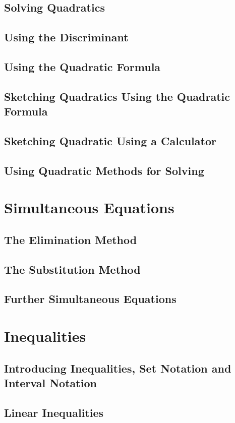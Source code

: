\documentclass[../maths.tex]{subfiles}
\begin{document}
\subsection*{Solving Quadratics}
\subsection*{Using the Discriminant}
\subsection*{Using the Quadratic Formula}
\subsection*{Sketching Quadratics Using the Quadratic Formula}
\subsection*{Sketching Quadratic Using a Calculator}
\subsection*{Using Quadratic Methods for Solving}
\section{Simultaneous Equations}
\subsection*{The Elimination Method}
\subsection*{The Substitution Method}
\subsection*{Further Simultaneous Equations}
\section{Inequalities}
\subsection*{Introducing Inequalities, Set Notation and Interval Notation}
\subsection*{Linear Inequalities}
\end{document}
